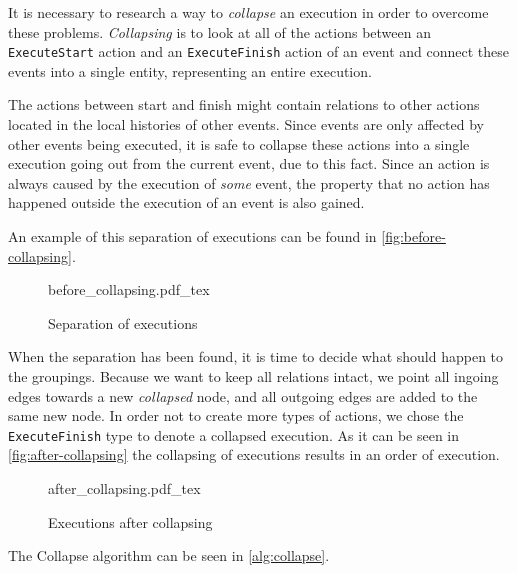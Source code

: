 	\newpar It is necessary to research a way to \textit{collapse} an execution in order to overcome these problems. \textit{Collapsing} is to look at all of the actions between an \texttt{ExecuteStart} action and an \texttt{ExecuteFinish} action of an event and connect these events into a single entity, representing an entire execution. 
	
	The actions between start and finish might contain relations to other actions located in the local histories of other events. Since events are only affected by other events being executed, it is safe to collapse these actions into a single execution going out from the current event, due to this fact. Since an action is always caused by the execution of \textit{some} event, the property that no action has happened outside the execution of an event is also gained. 
	
	An example of this separation of executions can be found in \autoref{fig:before-collapsing}.
	
	\begin{figure}
		\centering
		\def\svgwidth{0.42\columnwidth}
		\fontsize{6}{8}\selectfont
		{before_collapsing.pdf_tex}
		\caption{Separation of executions}
		\label{fig:before-collapsing}
	\end{figure}
	
	\newpar
	When the separation has been found, it is time to decide what should happen to the groupings. Because we want to keep all relations intact, we point all ingoing edges towards a new \textit{collapsed} node, and all outgoing edges are added to the same new node. In order not to create more types of actions, we chose the \texttt{ExecuteFinish} type to denote a collapsed execution. As it can be seen in \autoref{fig:after-collapsing} the collapsing of executions results in an order of execution.
	
	\begin{figure}
		\centering
		\def\svgwidth{0.22\columnwidth}
		\fontsize{6}{8}\selectfont
		{after_collapsing.pdf_tex}
		\caption{Executions after collapsing}
		\label{fig:after-collapsing}
	\end{figure}
	
	The Collapse algorithm can be seen in \autoref{alg:collapse}.
	
